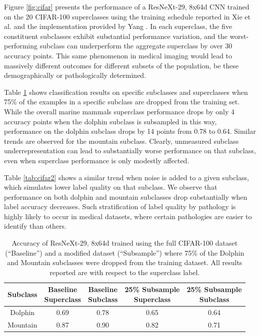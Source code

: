 \documentclass{article}
\begin{document}
 Figure \ref{fig:cifar} presents the performance of a ResNeXt-29, 8x64d CNN trained on the 20 CIFAR-100 superclasses using the training schedule reported in Xie et al. \citep{Xie2016-ip} and the implementation provided by Yang \citep{Yang_undated-bt}.  
In each superclass, the five constituent subclasses exhibit substantial performance variation, and the worst-performing subclass can underperform the aggregate superclass by over 30 accuracy points.  
This same phenomenon in medical imaging would lead to massively different outcomes for different subsets of the population, be these demographically or pathologically determined. 

 Table \ref{tab:cifar1} shows classification results on specific subclasses and superclasses when 75\% of the examples in a specific subclass are dropped from the training set.  
 While the overall marine mammals superclass performance drops by only 4 accuracy points when the dolphin subclass is subsampled in this way, performance on the dolphin subclass drops by 14 points from 0.78 to 0.64.  
 Similar trends are observed for the mountain subclass.  
 Clearly, unmeasured subclass underrepresentation can lead to substantially worse performance on that subclass, even when superclass performance is only modestly affected.
 
Table \ref{tab:cifar2} shows a similar trend when noise is added to a given subclass, which simulates lower label quality on that subclass.  We observe that performance on both dolphin and mountain subclasses drop substantially when label accuracy decreases.  
Such stratification of label quality by pathology is highly likely to occur in medical datasets, where certain pathologies are easier to identify than others.

\begin{table}[]
\centering
\begin{tabular}{|c|c|c|c|c|}
\hline
 Subclass & \makecell{Baseline \\ Superclass} & \makecell{Baseline \\ Subclass}   &  \makecell{25\% Subsample \\ Superclass}    & \makecell{25\% Subsample \\ Subclass}   \\
 \hline
 Dolphin & 0.69 & 0.78  & 0.65  & 0.64  \\
 Mountain & 0.87 & 0.90  & 0.82 & 0.71  \\
 \hline
\end{tabular}
\caption{Accuracy of ResNeXt-29, 8x64d trained using the full CIFAR-100 dataset (``Baseline'') and a modified dataset (``Subsample'') where 75\% of the Dolphin and Mountain subclasses were dropped from the training dataset.  All results reported are with respect to the superclass label.}
\label{tab:cifar1}
\vspace{-4mm}
\end{table}
\end{document}
